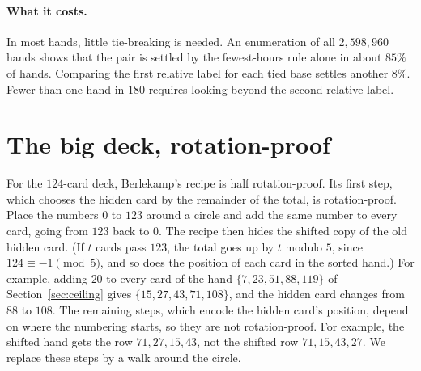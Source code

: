 \documentclass[11pt]{article}
\begin{document}
\paragraph{What it costs.}
In most hands, little tie-breaking is needed. An enumeration of all $2{,}598{,}960$ hands shows that the pair is settled by the fewest-hours rule alone in about $85\%$ of hands. Comparing the first relative label for each tied base settles another $8\%$. Fewer than one hand in $180$ requires looking beyond the second relative label.


\section{The big deck, rotation-proof}
\label{sec:bigdeck}
For the $124$-card deck, Berlekamp's recipe is half rotation-proof.
Its first step, which chooses the hidden card by the remainder of the total, is rotation-proof. Place the numbers $0$ to $123$ around a circle and add the same number to every card, going from $123$ back to $0$. The recipe then hides the shifted copy of the old hidden card. (If $t$ cards pass $123$, the total goes up by $t$ modulo $5$, since $124\equiv-1\pmod5$, and so does the position of each card in the sorted hand.)
For example, adding $20$ to every card of the hand $\{7,23,51,88,119\}$ of Section~\ref{sec:ceiling} gives $\{15,27,43,71,108\}$, and the hidden card changes from $88$ to $108$. 
The remaining steps, which encode the hidden card's position, depend on where the numbering starts, so they are not rotation-proof. For example, the shifted hand gets the row $71,27,15,43$, not the shifted row $71,15,43,27$. We replace these steps by a walk around the circle.
\end{document}
